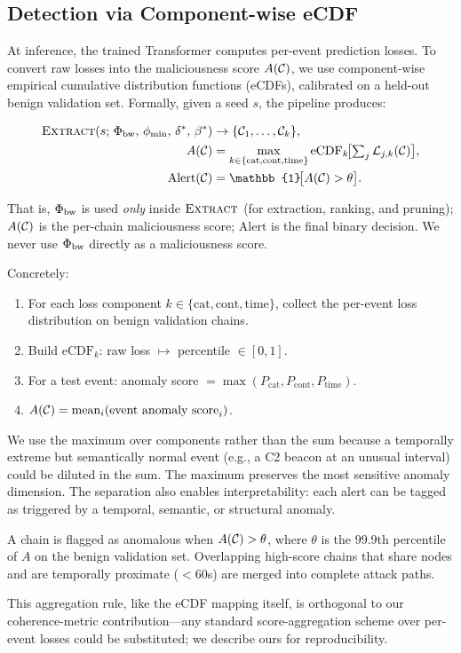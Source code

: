 \subsection{Detection via Component-wise eCDF}
\label{sec:detection}

At inference, the trained Transformer computes per-event prediction losses. To convert raw losses into the maliciousness score $A(\mathcal{C})$, we use component-wise empirical cumulative distribution functions (eCDFs), calibrated on a held-out benign validation set. Formally, given a seed $s$, the pipeline produces:

\begin{align}
\textsc{Extract}(s;\, \branchCoherence,\, \phi_{\min},\, \hoplimit^*,\, \timedecay^*) &\to \{\chain_1, \dots, \chain_k\}, \\
A(\chain) &= \max_{k \in \{\text{cat}, \text{cont}, \text{time}\}} \text{eCDF}_k\!\bigl[\textstyle\sum_{j} \mathcal{L}_{j,k}(\chain)\bigr], \\
\text{Alert}(\chain) &= \mathbb{1}\!\bigl[A(\chain) > \theta\bigr].
\end{align}

That is, $\Phi_{\text{bw}}$ is used \emph{only} inside $\textsc{Extract}$ (for extraction, ranking, and pruning); $A(\mathcal{C})$ is the per-chain maliciousness score; $\text{Alert}$ is the final binary decision. We never use $\Phi_{\text{bw}}$ directly as a maliciousness score.

Concretely:

\begin{enumerate}
\item For each loss component $k \in \{\text{cat}, \text{cont}, \text{time}\}$, collect the per-event loss distribution on benign validation chains.
\item Build $\text{eCDF}_k$: raw loss $\mapsto$ percentile $\in [0, 1]$.
\item For a test event: anomaly score $= \max(P_{\text{cat}}, P_{\text{cont}}, P_{\text{time}})$.
\item $A(\mathcal{C}) = \text{mean}_i (\text{event anomaly score}_i)$.
\end{enumerate}

We use the maximum over components rather than the sum because a temporally extreme but semantically normal event (e.g., a C2 beacon at an unusual interval) could be diluted in the sum. The maximum preserves the most sensitive anomaly dimension. The separation also enables interpretability: each alert can be tagged as triggered by a temporal, semantic, or structural anomaly.

A chain is flagged as anomalous when $A(\mathcal{C}) > \theta$, where $\theta$ is the 99.9th percentile of $A$ on the benign validation set. Overlapping high-score chains that share nodes and are temporally proximate ($<60$s) are merged into complete attack paths.

This aggregation rule, like the eCDF mapping itself, is orthogonal to our coherence-metric contribution---any standard score-aggregation scheme over per-event losses could be substituted; we describe ours for reproducibility.
